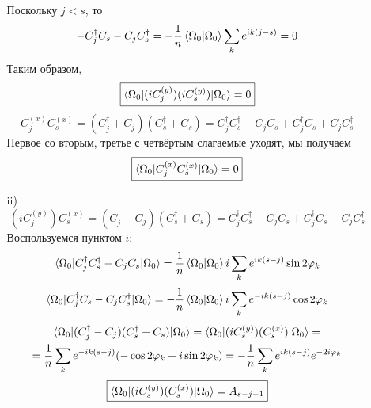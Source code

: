 \documentclass[12pt]{article}
\theoremstyle{definition}
\begin{document}
\begin{enumerate}
\begin{itemize}
        Поскольку $j<s$, то
        \begin{equation}
            -C^\dagger_jC_s-C_jC^\dagger_s=-\frac{1}{n}\braket{\Omega_0|\Omega_0}\sum\limits_ke^{ik(j-s)}=0
        \end{equation}
        Таким образом,
        \begin{equation}
            \boxed{\braket{\Omega_0|(iC^{(y)}_j)(iC^{(y)}_s)|\Omega_0}=0}
        \end{equation}
        \begin{equation}
            C^{(x)}_jC^{(x)}_s=(C^\dagger_j+C_j)(C^\dagger_s+C_s)=C^\dagger_jC^\dagger_s+C_jC_s+C^\dagger_jC_s+C_jC^\dagger_s
        \end{equation}
        Первое со вторым, третье с четвёртым слагаемые уходят, мы получаем
        \begin{equation}
            \boxed{\braket{\Omega_0|C^{(x)}_jC^{(x)}_s|\Omega_0}=0}
        \end{equation}
        \item[ii)]
        \begin{equation}
            (iC_j^{(y)})C^{(x)}_s=(C^\dagger_j-C_j)(C^\dagger_s+C_s)=C^\dagger_jC^\dagger_s-C_jC_s+C^\dagger_jC_s-C_jC^\dagger_s
        \end{equation}
        Воспользуемся пунктом $i$:
        \begin{equation}
            \braket{\Omega_0|C^\dagger_jC^\dagger_s-C_jC_s|\Omega_0}=\frac{1}{n}\braket{\Omega_0|\Omega_0}i\sum\limits_k e^{ik(s-j)}\sin2\varphi_k
        \end{equation}
        \begin{equation}
            \braket{\Omega_0|C^\dagger_jC_s-C_jC^\dagger_s|\Omega_0}=-\frac{1}{n}\braket{\Omega_0|\Omega_0}i\sum\limits_k e^{-ik(s-j)}\cos2\varphi_k
        \end{equation}
        \begin{multline}
            \braket{\Omega_0|(C^\dagger_j-C_j)(C^\dagger_s+C_s)|\Omega_0}=\braket{\Omega_0|(iC^{(y)}_s)(C^{(x)}_s)|\Omega_0}=\\=\frac{1}{n}\sum\limits_ke^{-ik(s-j)}(-\cos2\varphi_k+i\sin2\varphi_k)=-\frac{1}{n}\sum\limits_ke^{ik(s-j)}e^{-2i\varphi_k}
        \end{multline}
        \begin{equation}
            \boxed{\braket{\Omega_0|(iC^{(y)}_s)(C^{(x)}_s)|\Omega_0}=A_{s-j-1}}
        \end{equation}
        \begin{equation}

\end{equation}
\end{itemize}
\end{enumerate}
\end{document}

